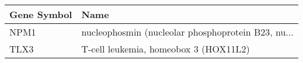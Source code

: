 \begin{tabular}{ll}
\toprule
Gene Symbol &                                               Name \\
\midrule
       NPM1 & nucleophosmin (nucleolar phosphoprotein B23, nu... \\
       TLX3 &              T-cell leukemia, homeobox 3 (HOX11L2) \\
\bottomrule
\end{tabular}
